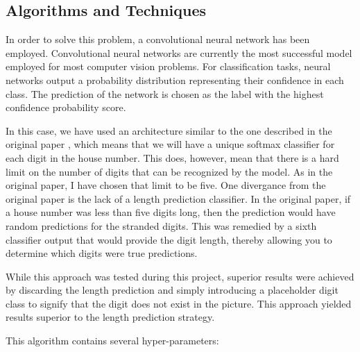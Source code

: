 \documentclass[12pt]{article}
\begin{document}
\subsection{Algorithms and Techniques}
In order to solve this problem, a convolutional neural network has been employed.
Convolutional neural networks are currently the most successful model employed for most computer vision problems.
For classification tasks, neural networks output a probability distribution representing their confidence in each class.
The prediction of the network is chosen as the label with the highest confidence probability score.

In this case, we have used an architecture similar to the one described in the original paper \cite{svhn_original_paper}, which means that we will have a unique softmax classifier for each digit in the house number.
This does, however, mean that there is a hard limit on the number of digits that can be recognized by the model.
As in the original paper, I have chosen that limit to be five.
One divergance from the original paper is the lack of a length prediction classifier.
In the original paper, if a house number was less than five digits long, then the prediction would have random predictions for the stranded digits.
This was remedied by a sixth classifier output that would provide the digit length, thereby allowing you to determine which digits were true predictions.

While this approach was tested during this project, superior results were achieved by discarding the length prediction and simply introducing a placeholder digit class to signify that the digit does not exist in the picture.
This approach yielded results superior to the length prediction strategy.

This algorithm contains several hyper-parameters:
\end{document}
